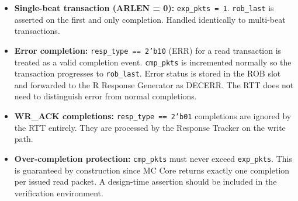 \begin{itemize}
  \item \textbf{Single-beat transaction (ARLEN = 0):} \texttt{exp\_pkts = 1}.
        \texttt{rob\_last} is asserted on the first and only completion.
        Handled identically to multi-beat transactions.
  \item \textbf{Error completion:} \texttt{resp\_type == 2'b10} (ERR)
        for a read transaction is treated as a valid completion event.
        \texttt{cmp\_pkts} is incremented normally so the transaction
        progresses to \texttt{rob\_last}. Error status is stored in the
        ROB slot and forwarded to the R Response Generator as DECERR.
        The RTT does not need to distinguish error from normal
        completions.
  \item \textbf{WR\_ACK completions:} \texttt{resp\_type == 2'b01}
        completions are ignored by the RTT entirely. They are processed
        by the Response Tracker on the write path.
  \item \textbf{Over-completion protection:} \texttt{cmp\_pkts} must
        never exceed \texttt{exp\_pkts}. This is guaranteed by
        construction since MC Core returns exactly one completion per
        issued read packet. A design-time assertion should be included
        in the verification environment.
\end{itemize}